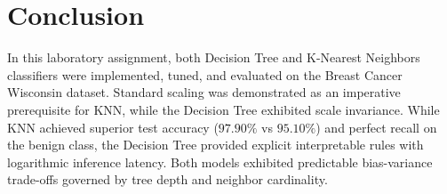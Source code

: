 \documentclass[12pt]{article}
\begin{document}
\section{Conclusion}
In this laboratory assignment, both Decision Tree and K-Nearest Neighbors classifiers were implemented, tuned, and evaluated on the Breast Cancer Wisconsin dataset. Standard scaling was demonstrated as an imperative prerequisite for KNN, while the Decision Tree exhibited scale invariance. While KNN achieved superior test accuracy ($97.90\%$ vs $95.10\%$) and perfect recall on the benign class, the Decision Tree provided explicit interpretable rules with logarithmic inference latency. Both models exhibited predictable bias-variance trade-offs governed by tree depth and neighbor cardinality.
\end{document}
